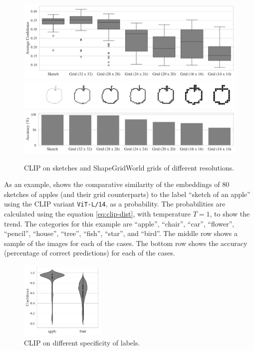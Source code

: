 \begin{figure}[H]
    \centering
    \includegraphics[width=\textwidth]{images/grid_comparison.pdf}
    \includegraphics[width=\textwidth]{images/grid_comparison_images.png}
    \includegraphics[width=\textwidth]{images/grid_comparison_accuracy.pdf}
    \caption{CLIP on sketches and ShapeGridWorld grids of different resolutions.}
    \label{fig:clip-sketches}
\end{figure}

As an example,  shows the comparative similarity of the embeddings of \(80\) sketches of apples (and their grid counterparts) to the label ``sketch of an apple'' using the CLIP variant \texttt{ViT-L/14}, as a probability.
The probabilities are calculated using the equation \eqref{eq:clip-dist}, with temperature \(T = 1\), to show the trend.
The categories for this example are ``apple'', ``chair'', ``car'', ``flower'', ``pencil'', ``house'', ``tree'', ``fish'', ``star'', and ``bird''.
The middle row shows a sample of the images for each of the cases.
The bottom row shows the accuracy (percentage of correct predictions) for each of the cases.

\begin{figure}
    \centering
    \includegraphics[width=0.36\textwidth]{images/hypercategory_comparison_2.pdf}
    \caption{CLIP on different specificity of labels.}
    \label{fig:clip-hypercategory}
\end{figure}

